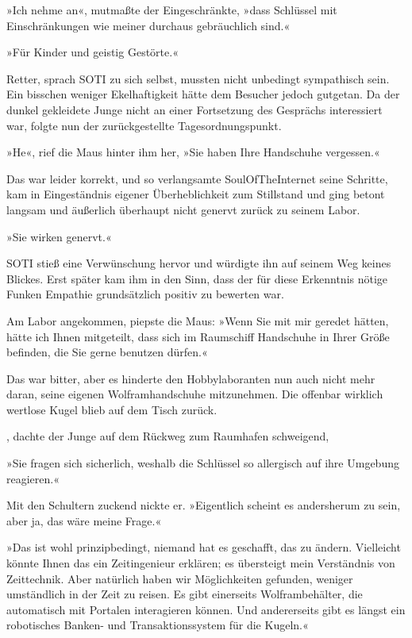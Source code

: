 »Ich nehme an«, mutmaßte der Eingeschränkte, »dass Schlüssel mit Einschränkungen wie meiner durchaus gebräuchlich sind.«

»Für Kinder und geistig Gestörte.«

Retter, sprach SOTI zu sich selbst, mussten nicht unbedingt sympathisch sein. Ein bisschen weniger Ekelhaftigkeit hätte dem Besucher jedoch gutgetan. Da der dunkel gekleidete Junge nicht an einer Fortsetzung des Gesprächs interessiert war, folgte nun der zurückgestellte Tagesordnungspunkt.

»He«, rief die Maus hinter ihm her, »Sie haben Ihre Handschuhe vergessen.«

Das war leider korrekt, und so verlangsamte SoulOfTheInternet seine Schritte, kam in Eingeständnis eigener Überheblichkeit zum Stillstand und ging betont langsam und äußerlich überhaupt nicht genervt zurück zu seinem Labor.

»Sie wirken genervt.«

SOTI stieß eine Verwünschung hervor und würdigte ihn auf seinem Weg keines Blickes. Erst später kam ihm in den Sinn, dass der für diese Erkenntnis nötige Funken Empathie grundsätzlich positiv zu bewerten war.

Am Labor angekommen, piepste die Maus: »Wenn Sie mit mir geredet hätten, hätte ich Ihnen mitgeteilt, dass sich im Raumschiff Handschuhe in Ihrer Größe befinden, die Sie gerne benutzen dürfen.«

Das war bitter, aber es hinderte den Hobbylaboranten nun auch nicht mehr daran, seine eigenen Wolframhandschuhe mitzunehmen. Die offenbar wirklich wertlose Kugel blieb auf dem Tisch zurück.

, dachte der Junge auf dem Rückweg zum Raumhafen schweigend, 

»Sie fragen sich sicherlich, weshalb die Schlüssel so allergisch auf ihre Umgebung reagieren.«

Mit den Schultern zuckend nickte er. »Eigentlich scheint es andersherum zu sein, aber ja, das wäre meine Frage.«

»Das ist wohl prinzipbedingt, niemand hat es geschafft, das zu ändern. Vielleicht könnte Ihnen das ein Zeitingenieur erklären; es übersteigt mein Verständnis von Zeittechnik. Aber natürlich haben wir Möglichkeiten gefunden, weniger umständlich in der Zeit zu reisen. Es gibt einerseits Wolframbehälter, die automatisch mit Portalen interagieren können. Und andererseits gibt es längst ein robotisches Banken- und Transaktionssystem für die Kugeln.«

